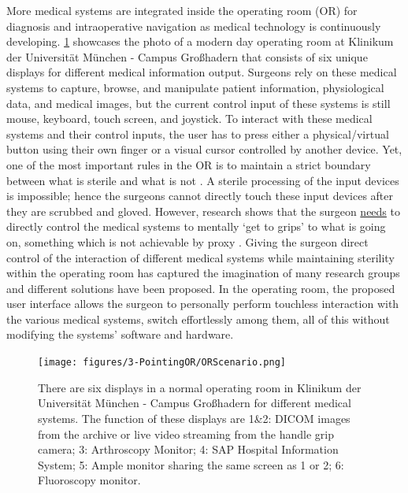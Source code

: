 More medical systems are integrated inside the operating room (OR) for diagnosis and intraoperative navigation as medical technology is continuously developing. \figurename{\ref{fig:3-PointingOR:ORScenario}} showcases the photo of a modern day operating room at Klinikum der Universit\"at M\"unchen - Campus Gro{\ss}hadern that consists of six unique displays for different medical information output.
Surgeons rely on these medical systems to capture, browse, and manipulate patient information, physiological data, and medical images, but the current control input of these systems is still mouse, keyboard, touch screen, and joystick. To interact with these medical systems and their control inputs, the user has to press either a physical/virtual button using their own finger or a visual cursor controlled by another device.
Yet, one of the most important rules in the OR is to maintain a strict boundary between what is sterile and what is not \cite{OHara2014a}. A sterile processing of the input devices is impossible; hence the surgeons cannot directly touch these input devices after they are scrubbed and gloved. However, research shows that the surgeon \underline{needs} to directly control the medical systems to mentally `get to grips' to what is going on, something which is not achievable by proxy \cite{Johnson2011a}. Giving the surgeon direct control of the interaction of different medical systems while maintaining sterility within the operating room has captured the imagination of many research groups and different solutions have been proposed.
In the operating room, the proposed user interface allows the surgeon to personally perform touchless interaction with the various medical systems, switch effortlessly among them, all of this without modifying the systems' software and hardware.
\begin{figure} [htb]
	\texttt{[image: figures/3-PointingOR/ORScenario.png]}
	\caption{There are six displays in a normal operating room in Klinikum der Universit\"at M\"unchen - Campus Gro{\ss}hadern for different medical systems. The function of these displays are 1\&2: DICOM images from the archive or live video streaming from the handle grip camera; 3: Arthroscopy Monitor; 4: SAP Hospital Information System; 5: Ample monitor sharing the same screen as 1 or 2; 6: Fluoroscopy monitor.}
	\label{fig:3-PointingOR:ORScenario}       %
\end{figure}
